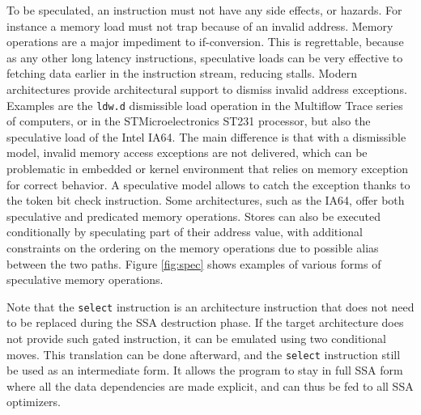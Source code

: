 To be speculated, an instruction must not have any side effects, or hazards. For instance a memory load must not trap because of an invalid address. 
Memory operations are  a major impediment to if-conversion. This is regrettable, because as any other long latency instructions, speculative loads can be very effective to fetching data earlier in the instruction stream, reducing stalls. Modern architectures provide architectural support to dismiss invalid address exceptions. Examples are the \texttt{ldw.d} dismissible load operation in the Multiflow Trace series of computers, or in the STMicroelectronics ST231 processor, but also the speculative load of the Intel IA64. The main difference is that with a dismissible model, invalid memory access exceptions are not delivered, which can be problematic in embedded or kernel environment that relies on memory exception for correct behavior. A speculative model allows to catch the exception thanks to the token bit check instruction. Some architectures, such as the IA64, offer both speculative and predicated memory operations.
%
Stores can also be executed conditionally by speculating part of their address value, with additional constraints on the ordering on the memory operations due to possible alias between the two paths. Figure \ref{fig:spec} shows examples of various forms of speculative memory operations.

Note that the \texttt{select} instruction is an architecture instruction that does not need to be replaced during the SSA destruction phase. If the target architecture does not provide such gated instruction, it can be emulated using two conditional moves. This translation can be done afterward, and the \texttt{select} instruction still be used as an intermediate form. It allows the program to stay in full SSA form where all the data dependencies are made explicit, and can thus be fed to all SSA optimizers. 

